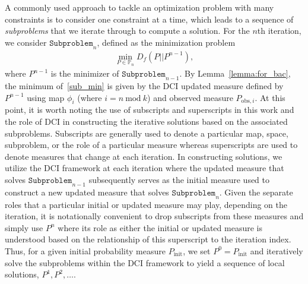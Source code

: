 \documentclass{article}
\newcommand{\p}{\mathbb{P}}
\newcommand{\obsmeasi}{P_{\text{obs}, i}}
\begin{document}
A commonly used approach to tackle an optimization problem with many constraints is to consider one constraint at a time, which leads to a sequence of \textit{subproblems} that we iterate through to compute a solution. 
For the $n$th iteration, we consider $\mathtt{Subproblem}_n$, defined as the minimization problem
\begin{align} \label{sub_min}
    \min_{P \in \p_{n}} D_f(P ||P^{n-1}),
\end{align}
where $P^{n-1}$ is the minimizer of $\mathtt{Subproblem}_{n-1}$.
By Lemma~\ref{lemma:for_bac}, the minimum of~\eqref{sub_min} is given by the DCI updated measure  defined by $P^{n-1}$ using map $\phi_i$ (where $i=n \mathrm{~mod~} k$) and observed measure $\obsmeasi$.
At this point, it is worth noting the use of subscripts and superscripts in this work and the role of DCI in constructing the iterative solutions based on the associated subproblems.
Subscripts are generally used to denote a particular map, space, subproblem, or the role of a particular measure whereas superscripts are used to denote measures that change at each iteration. 
In constructing solutions, we utilize the DCI framework at each iteration where the updated measure that solves $\mathtt{Subproblem}_{n-1}$ subsequently serves as the initial measure used to construct a new updated measure that solves $\mathtt{Subproblem}_n$. 
Given the separate roles that a particular initial or updated measure may play, depending on the iteration, it is notationally convenient to drop subscripts from these measures and simply use $P^n$ where its role as either the initial or updated measure is understood based on the relationship of this superscript to the iteration index.
Thus, for a given initial probability measure $P_\text{init}$, we set $P^0=P_\text{init}$ and iteratively solve the subproblems within the DCI framework to yield a sequence of local solutions, $P^1, P^2, \ldots$. 
\end{document}
